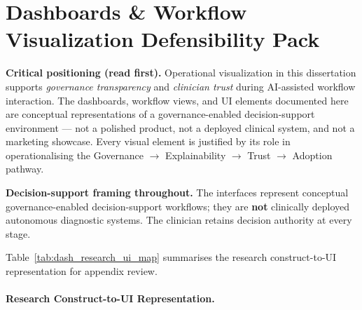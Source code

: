 \section*{Dashboards \& Workflow Visualization Defensibility Pack}
\label{sec:dash_defensibility_pack}

\noindent\textbf{Critical positioning (read first).} Operational visualization in this dissertation supports \emph{governance transparency} and \emph{clinician trust} during AI-assisted workflow interaction. The dashboards, workflow views, and UI elements documented here are conceptual representations of a governance-enabled decision-support environment --- not a polished product, not a deployed clinical system, and not a marketing showcase. Every visual element is justified by its role in operationalising the Governance $\to$ Explainability $\to$ Trust $\to$ Adoption pathway.

\noindent\textbf{Decision-support framing throughout.} The interfaces represent conceptual governance-enabled decision-support workflows; they are \textbf{not} clinically deployed autonomous diagnostic systems. The clinician retains decision authority at every stage.

\noindent Table~\ref{tab:dash_research_ui_map} summarises the research construct-to-UI representation for appendix review.

\paragraph{Research Construct-to-UI Representation.}





